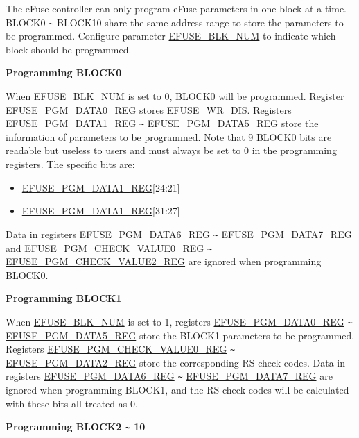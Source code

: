 \documentclass[main\_\_EN.tex]{subfiles}
\begin{document}
The eFuse controller can only program eFuse parameters in one block at a time. BLOCK0 \verb+~+ BLOCK10 share the same address range to store the parameters to be programmed. Configure parameter \hyperref[fielddesc:EFUSEBLKNUM]{EFUSE\_BLK\_NUM} to indicate which block should be programmed.

{\bfseries Programming BLOCK0}

When \hyperref[fielddesc:EFUSEBLKNUM]{EFUSE\_BLK\_NUM} is set to 0, BLOCK0 will be programmed. Register \hyperref[regdesc:EFUSEPGMDATA0REG]{EFUSE\_PGM\_DATA0\_REG} stores \hyperref[fielddesc:EFUSEWRDIS]{EFUSE\_WR\_DIS}. Registers \hyperref[regdesc:EFUSEPGMDATA1REG]{EFUSE\_PGM\_DATA1\_REG} \verb+~+ \hyperref[regdesc:EFUSEPGMDATA5REG]{EFUSE\_PGM\_DATA5\_REG} store the information of parameters to be programmed. Note that 9 BLOCK0 bits are readable but useless to users and must always be set to 0 in the programming registers. The specific bits are:

\begin{itemize}
    \item \hyperref[regdesc:EFUSEPGMDATA1REG]{EFUSE\_PGM\_DATA1\_REG}[24:21]
    \item \hyperref[regdesc:EFUSEPGMDATA1REG]{EFUSE\_PGM\_DATA1\_REG}[31:27]
\end{itemize}

Data in registers \hyperref[regdesc:EFUSEPGMDATA6REG]{EFUSE\_PGM\_DATA6\_REG} \verb+~+ \hyperref[regdesc:EFUSEPGMDATA7REG]{EFUSE\_PGM\_DATA7\_REG} and \hyperref[regdesc:EFUSEPGMCHECKVALUE0REG]{EFUSE\_PGM\_CHECK\_VALUE0\_REG} \verb+~+ \hyperref[regdesc:EFUSEPGMCHECKVALUE2REG]{EFUSE\_PGM\_CHECK\_VALUE2\_REG} are ignored when programming BLOCK0.

{\bfseries Programming BLOCK1}

When \hyperref[fielddesc:EFUSEBLKNUM]{EFUSE\_BLK\_NUM} is set to 1, registers \hyperref[regdesc:EFUSEPGMDATA0REG]{EFUSE\_PGM\_DATA0\_REG} \verb+~+ \hyperref[regdesc:EFUSEPGMDATA5REG]{EFUSE\_PGM\_DATA5\_REG} store the BLOCK1 parameters to be programmed. Registers \hyperref[regdesc:EFUSEPGMCHECKVALUE0REG]{EFUSE\_PGM\_CHECK\_VALUE0\_REG} \verb+~+ \hyperref[regdesc:EFUSEPGMDATA2REG]{EFUSE\_PGM\_DATA2\_REG} store the corresponding RS check codes. Data in registers \hyperref[regdesc:EFUSEPGMDATA6REG]{EFUSE\_PGM\_DATA6\_REG} \verb+~+ \hyperref[regdesc:EFUSEPGMDATA7REG]{EFUSE\_PGM\_DATA7\_REG} are ignored when programming BLOCK1, and the RS check codes will be calculated with these bits all treated as 0.

{\bfseries Programming BLOCK2 \verb+~+ 10}
\end{document}
